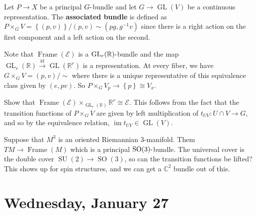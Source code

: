 \begin{definition}

Let \(P\to X\) be a principal \(G{\hbox{-}}\)bundle and let
\(G\to \operatorname{GL}(V)\) be a continuous representation. The
\textbf{associated bundle} is defined as
\(P\times_G V = \left\{{(p, v)}\right\} / (p, v) \sim (pg, g ^{-1} v)\)
since there is a right action on the first component and a left action
on the second.

\end{definition}

\begin{example}[?]

Note that \({\operatorname{Frame}}(\mathcal{E})\) is a
\(\operatorname{GL}_r({\mathbb{R}}){\hbox{-}}\)bundle and the map
\(\operatorname{GL}_r({\mathbb{R}}) \xrightarrow{\operatorname{id}} \operatorname{GL}({\mathbb{R}}^r)\)
is a representation. At every fiber, we have
\(G \times_G V = (p, v)/\sim\) where there is a unique representative of
this equivalence class given by \((e, pv)\). So
\(P\times_G V_p \to \left\{{p}\right\} \cong V_x\).

\begin{exercise}[?]

Show that
\({\operatorname{Frame}}( \mathcal{E}) \times_{\operatorname{GL}_r({\mathbb{R}})} {\mathbb{R}}^r \cong \mathcal{E}\).
This follows from the fact that the transition functions of
\(P \times_G V\) are given by left multiplication of
\(t_{UV}: U \cap V \to G\), and so by the equivalence relation,
\(\operatorname{im}t_{UV} \in \operatorname{GL}(V)\).

\end{exercise}

\end{example}

\begin{remark}

Suppose that \(M^3\) is an oriented Riemannian 3-manifold. Them
\(TM\to {\operatorname{Frame}}(M)\) which is a principal
\({\operatorname{SO}}(3){\hbox{-}}\)bundle. The universal cover is the
double cover \({\operatorname{SU}}(2) \to {\operatorname{SO}}(3)\), so
can the transition functions be lifted? This shows up for spin
structures, and we can get a \({\mathbb{C}}^2\) bundle out of this.

\end{remark}

\hypertarget{wednesday-january-27}{%
\section{Wednesday, January 27}\label{wednesday-january-27}}

